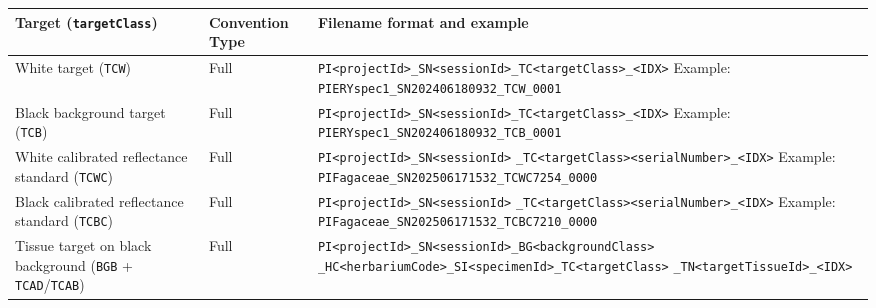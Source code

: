\documentclass[
  letterpaper,
  DIV=11,
  numbers=noendperiod]{scrreprt}
\begin{document}
\begin{longtable}[]{@{}
  >{\raggedright\arraybackslash}p{}
  >{\raggedright\arraybackslash}p{}
  >{\raggedright\arraybackslash}p{}@{}}
\toprule\noalign{}
\begin{minipage}[b]{\linewidth}\raggedright
Target (\texttt{targetClass})
\end{minipage} & \begin{minipage}[b]{\linewidth}\raggedright
Convention Type
\end{minipage} & \begin{minipage}[b]{\linewidth}\raggedright
Filename format and example
\end{minipage} \\
\midrule\noalign{}
\endhead
\bottomrule\noalign{}
\endlastfoot
White target (\texttt{TCW}) & Full &
\texttt{PI\textless{}projectId\textgreater{}\_SN\textless{}sessionId\textgreater{}\_TC\textless{}targetClass\textgreater{}\_\textless{}IDX\textgreater{}}
Example: \texttt{PIERYspec1\_SN202406180932\_TCW\_0001} \\
Black background target (\texttt{TCB}) & Full &
\texttt{PI\textless{}projectId\textgreater{}\_SN\textless{}sessionId\textgreater{}\_TC\textless{}targetClass\textgreater{}\_\textless{}IDX\textgreater{}}
Example: \texttt{PIERYspec1\_SN202406180932\_TCB\_0001} \\
White calibrated reflectance standard (\texttt{TCWC}) & Full &
\texttt{PI\textless{}projectId\textgreater{}\_SN\textless{}sessionId\textgreater{}}
\texttt{\_TC\textless{}targetClass\textgreater{}\textless{}serialNumber\textgreater{}\_\textless{}IDX\textgreater{}}
Example: \texttt{PIFagaceae\_SN202506171532\_TCWC7254\_0000} \\
Black calibrated reflectance standard (\texttt{TCBC}) & Full &
\texttt{PI\textless{}projectId\textgreater{}\_SN\textless{}sessionId\textgreater{}}
\texttt{\_TC\textless{}targetClass\textgreater{}\textless{}serialNumber\textgreater{}\_\textless{}IDX\textgreater{}}
Example: \texttt{PIFagaceae\_SN202506171532\_TCBC7210\_0000} \\
Tissue target on black background (\texttt{BGB} +
\texttt{TCAD}/\texttt{TCAB}) & Full &
\texttt{PI\textless{}projectId\textgreater{}\_SN\textless{}sessionId\textgreater{}\_BG\textless{}backgroundClass\textgreater{}}
\texttt{\_HC\textless{}herbariumCode\textgreater{}\_SI\textless{}specimenId\textgreater{}\_TC\textless{}targetClass\textgreater{}}
\texttt{\_TN\textless{}targetTissueId\textgreater{}\_\textless{}IDX\textgreater{}}

\end{longtable}
\end{document}
